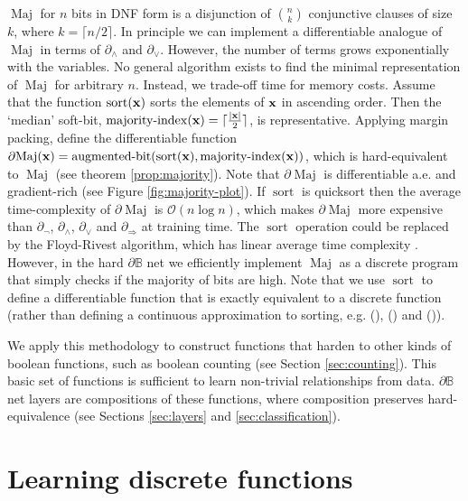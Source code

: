 \documentclass{article}
\theoremstyle{plain}
\theoremstyle{definition}
\theoremstyle{remark}
\newcommand{\citemyauthoryear}[1]{\citeauthor{#1} (\citeyear{#1})}
\begin{document}
$\operatorname{Maj}$ for $n$ bits in DNF form is a disjunction of $\binom{n}{k}$ conjunctive clauses of size $k$, where $k=\lceil n/2 \rceil$. In principle we can implement a differentiable analogue of $\operatorname{Maj}$ in terms of $\partial_{\wedge}$ and $\partial_{\vee}$. However, the number of terms grows exponentially with the variables. No general algorithm exists to find the minimal representation of $\operatorname{Maj}$ for arbitrary $n$. Instead, we trade-off time for memory costs. Assume that the function $\operatorname{sort}({\bf x})$ sorts the elements of ${\bf x}$ in ascending order. Then the `median' soft-bit,
$\operatorname{majority-index}({\bf x}) = \lceil \frac{|{\bf x}|}{2} \rceil$,
is representative. Applying margin packing, define the differentiable function
$\partial\!\operatorname{Maj}({\bf x}) = \operatorname{augmented-bit}(\operatorname{sort}({\bf x}), \operatorname{majority-index}({\bf x}))$,
which is hard-equivalent to $\operatorname{Maj}$ (see theorem \ref{prop:majority}). Note that $\partial\!\operatorname{Maj}$ is differentiable a.e. and gradient-rich (see Figure \ref{fig:majority-plot}). If $\operatorname{sort}$ is quicksort then the average time-complexity of $\partial\!\operatorname{Maj}$ is $\mathcal{O}(n\log{}n)$, which makes $\partial\!\operatorname{Maj}$ more expensive than $\partial_{\neg}$, $\partial_{\wedge}$, $\partial_{\vee}$ and $\partial_{\Rightarrow}$ at training time. The $\operatorname{sort}$ operation could be replaced by the Floyd-Rivest algorithm, which has linear average time complexity \cite{KIWIEL2005214}. However, in the hard $\partial\mathbb{B}$ net we efficiently implement $\operatorname{Maj}$ as a discrete program that simply checks if the majority of bits are high. Note that we use $\operatorname{sort}$ to define a differentiable function that is exactly equivalent to a discrete function (rather than defining a continuous approximation to sorting, e.g. \citemyauthoryear{NEURIPS2019_d8c24ca8}, \citemyauthoryear{grover2018stochastic} and \citemyauthoryear{petersen2022monotonic}).

We apply this methodology to construct functions that harden to other kinds of boolean functions, such as boolean counting (see Section \ref{sec:counting}). This basic set of functions is sufficient to learn non-trivial relationships from data. $\partial\mathbb{B}$ net layers are compositions of these functions, where composition preserves hard-equivalence  (see Sections \ref{sec:layers} and \ref{sec:classification}). 

\section{Learning discrete functions}\label{sec:discrete}
\end{document}
